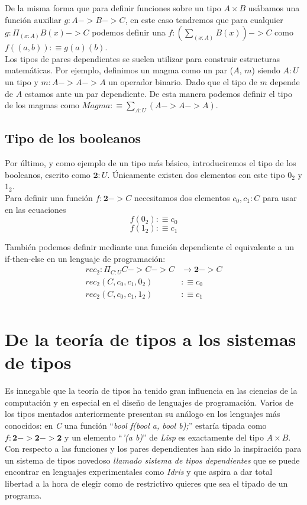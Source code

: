 De la misma forma que para definir funciones sobre un tipo $A \times B$ usábamos una función auxiliar $g : A -> B -> C$, en este caso tendremos que para cualquier $g : \Pi_{(x:A)}B(x) -> C$ podemos definir una $f : (\sum_{(x:A)} B(x)) -> C$ como $f((a, b)) :\equiv g(a)(b)$.\\

Los tipos de pares dependientes se suelen utilizar para construir estructuras matemáticas. Por ejemplo, definimos un magma como un par ($A$, $m$) siendo $A:U$ un tipo y $m : A -> A -> A$ un operador binario. Dado que el tipo de $m$ depende de $A$ estamos ante un par dependiente. De esta manera podemos definir el tipo de los magmas como $Magma :\equiv \sum_{A:U} (A -> A -> A)$.\\

\subsection{Tipo de los booleanos}
Por último, y como ejemplo de un tipo más básico, introduciremos el tipo de los booleanos, escrito como $\textbf{2}:U$. Únicamente existen dos elementos con este tipo $0_2$ y $1_2$.\\

Para definir una función $f : \textbf{2} -> C$ necesitamos dos elementos $c_0, c_1:C$ para usar en las ecuaciones\\
$$f(0_2) :\equiv c_0$$
$$f(1_2) :\equiv c_1$$

También podemos definir mediante una función dependiente el equivalente a un if-then-else en un lenguaje de programación:\\

\begin{align*}
  rec_2 \colon \Pi_{C:U} C ->  C -> C &\to \textbf{2} -> C\\
  rec_2(C, c_0, c_1, 0_2) &:\equiv c_0\\
  rec_2(C, c_0, c_1, 1_2) &:\equiv c_1\\
\end{align*}


\section{De la teoría de tipos a los sistemas de tipos}
Es innegable que la teoría de tipos ha tenido gran influencia en las ciencias de la computación y en especial en el diseño de lenguajes de programación. Varios de los tipos mentados anteriormente presentan su análogo en los lenguajes más conocidos: en \textit{C} una función ``\textit{bool f(bool a, bool b);}'' estaría tipada como $f : \textbf{2} -> \textbf{2} -> \textbf{2}$ y un elemento ``\textit{'(a b)}'' de \textit{Lisp} es exactamente del tipo $A \times B$. Con respecto a las funciones y los pares dependientes han sido la inspiración para un sistema de tipos novedoso \textit{llamado sistema de tipos dependientes} que se puede encontrar en lenguajes experimentales como \textit{Idris} y que aspira a dar total libertad a la hora de elegir como de restrictivo quieres que sea el tipado de un programa.\\

